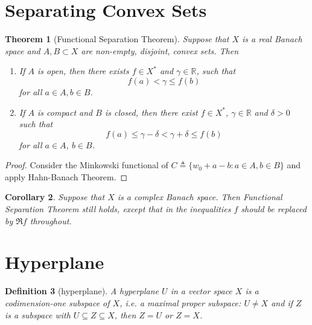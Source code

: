 \documentclass[12pt,a4paper]{report}
\numberwithin{equation}{section}
\theoremstyle{mystyle}
\newtheorem{definition}{Definition}[section]
\newtheorem{theorem}[definition]{Theorem}
\newtheorem{corollary}[definition]{Corollary}
\newcommand{\R}{\mathbb{R}}
\begin{document}
	\section{Separating Convex Sets}
	\begin{theorem}[Functional Separation Theorem]
		Suppose that $X$ is a real Banach space and $A,B\subset X$ are non-empty, disjoint, convex sets. Then
		\begin{enumerate}
			\item If $A$ is open, then there exists $f\in X^*$ and $\gamma\in \R$, such that
			$$
			f(a)<\gamma\leq f(b)
			$$
			for all $a\in A, b\in B$.
			\item If $A$ is compact and $B$ is closed, then there exist $f\in X^*$, $\gamma\in \R$ and $\delta>0$ such that
			$$
			f(a)\leq \gamma-\delta < \gamma+\delta \leq f(b)
			$$
			for all $a\in A$, $b\in B$.
		\end{enumerate}
	\end{theorem}
	\begin{proof}
		Consider the Minkowski functional of $C\triangleq \{w_0+a-b:a\in A,b\in B\}$ and apply Hahn-Banach Theorem.
	\end{proof}
	
	\begin{corollary}
		Suppose that $X$ is a complex Banach space. Then Functional Separation Theorem still holds, except that in the inequalities $f$ should be replaced by $\Re f$ throughout.
	\end{corollary}
	
	
	\section{Hyperplane}
	\begin{definition}[hyperplane]
		A \emph{hyperplane} $U$ in a vector space $X$ is a codimension-one subspace of $X$, i.e. a maximal proper subspace: $U\neq X$ and if $Z$ is a subspace with $U\subseteq Z\subseteq X$, then $Z=U$ or $Z=X$.
	\end{definition}
	
\end{document}
